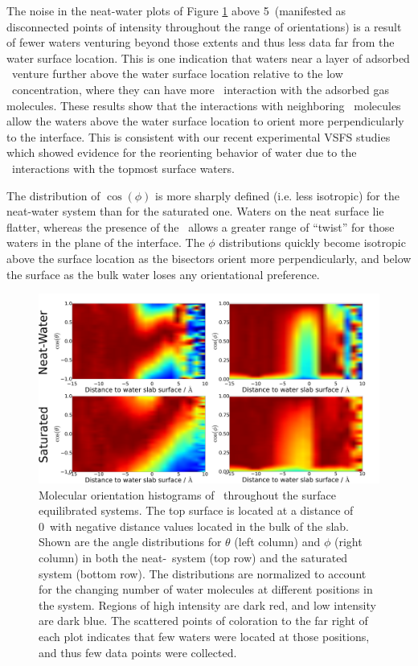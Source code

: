 \documentclass{article}
\begin{document}
The noise in the neat-water plots of Figure \ref{fig:water-orientation} above 5\angs~(manifested as disconnected points of intensity throughout the range of orientations) is a result of fewer waters venturing beyond those extents and thus less data far from the water surface location. This is one indication that waters near a layer of adsorbed \suldiox~venture further above the water surface location relative to the low \suldiox~concentration, where they can have more \suldiox~interaction with the adsorbed gas molecules. These results show that the interactions with neighboring \suldiox~molecules allow the waters above the water surface location to orient more perpendicularly to the interface. This is consistent with our recent experimental VSFS studies which showed evidence for the reorienting behavior of water due to the \suldiox~interactions with the topmost surface waters.\cite{Ota2011}

The distribution of $\cos(\phi)$ is more sharply defined (i.e. less isotropic) for the neat-water system than for the saturated one. Waters on the neat surface lie flatter, whereas the presence of the \suldiox~allows a greater range of ``twist'' for those waters in the plane of the interface. The $\phi$ distributions quickly become isotropic above the surface location as the bisectors orient more perpendicularly, and below the surface as the bulk water loses any orientational preference.


\begin{figure}[h!]
	\begin{center}
		\includegraphics[scale=1.0]{images/h2oangles.png}
		\caption{Molecular orientation histograms of \wat~throughout the surface equilibrated systems. The top surface is located at a distance of 0\angs~with negative distance values located in the bulk of the slab. Shown are the angle distributions for $\theta$ (left column) and $\phi$ (right column) in both the neat-\wat~system (top row) and the saturated system (bottom row). The distributions are normalized to account for the changing number of water molecules at different positions in the system. Regions of high intensity are dark red, and low intensity are dark blue. The scattered points of coloration to the far right of each plot indicates that few waters were located at those positions, and thus few data points were collected.}
		\label{fig:water-orientation}
	\end{center}
\end{figure}
\end{document}
